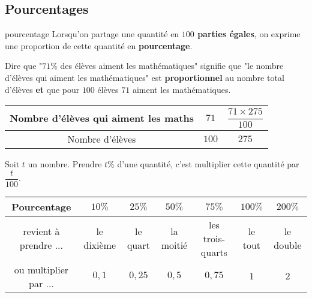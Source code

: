   
\begin{pageCours}

\section{Pourcentages}

\begin{DefT}{pourcentage}
Lorsqu'on partage une quantité en \textbf{$100$ parties égales}, on exprime une proportion de cette quantité en \textbf{pourcentage}.
\end{DefT}

\begin{Ex}
Dire que "$71\%$ des élèves aiment les mathématiques" signifie que "le nombre d'élèves qui aiment les mathématiques" est \textbf{proportionnel} au nombre total d'élèves \textbf{et} que pour $100$ élèves $71$ aiment les mathématiques.

\begin{center}
\begin{tabular}{|c|c|c|}\hline
Nombre d'élèves qui aiment les maths  & $71$ & $\dfrac{71 \times 275}{100}$ \\\hline
Nombre d'élèves & $100$ & $275$ \\\hline
\end{tabular}
\end{center}
\end{Ex}

\begin{Pp}
Soit $t$ un nombre. Prendre $t\%$ d'une quantité, c'est multiplier cette quantité par $\dfrac{t}{100}$.
\end{Pp}

\vspace{0.2cm}


\begin{center}
\begin{tabular}{|c|c|c|c|c|c|c|}\hline
Pourcentage & $10\%$ & $25\%$ & $50\%$ & $75\%$ & $100\%$ & $200\%$  \\\hline
revient à prendre ... & le dixième & le quart & la moitié & les trois-quarts & le tout & le double \\\hline
ou multiplier par ... & $0,1$ & $0,25$ & $0,5$ & $0,75$ & $1$ & $2$ \\\hline
\end{tabular}
\end{center}



\end{pageCours}
